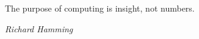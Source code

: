 \vspace*{6cm}

{\LARGE The purpose of computing is insight, not numbers.}

\hfill {\large \emph{Richard Hamming}}
